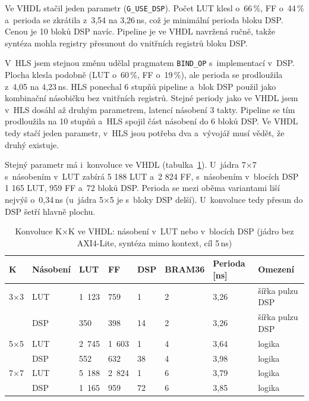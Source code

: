 
Ve VHDL stačil jeden parametr (\texttt{G\_USE\_DSP}). Počet LUT klesl o~66\,\%, FF o~44\,\% a~perioda se zkrátila z~3,54 na 3,26\,ns, což je minimální perioda bloku DSP. Cenou je 10 bloků DSP navíc. Pipeline je ve VHDL navržená ručně, takže syntéza mohla registry přesunout do vnitřních registrů bloku DSP.

V~HLS jsem stejnou změnu udělal pragmatem \texttt{BIND\_OP} s~implementací v~DSP. Plocha klesla podobně (LUT o~60\,\%, FF o~19\,\%), ale perioda se prodloužila z~4,05 na 4,23\,ns. HLS ponechal 6 stupňů pipeline a~blok DSP použil jako kombinační násobičku bez vnitřních registrů. Stejné periody jako ve VHDL jsem v~HLS dosáhl až druhým parametrem, latencí násobení 3 takty. Pipeline se tím prodloužila na 10 stupňů a~HLS spojil část násobení do 6 bloků DSP. Ve VHDL tedy stačí jeden parametr, v~HLS jsou potřeba dva a~vývojář musí vědět, že druhý existuje.

Stejný parametr má i~konvoluce ve VHDL (tabulka~\ref{tab:filtrdsp}). U~jádra 7×7 s~násobením v~LUT zabírá 5 188 LUT a~2 824 FF, s~násobením v~blocích DSP 1 165 LUT, 959 FF a~72 bloků DSP. Perioda se mezi oběma variantami liší nejvýš o~0,34\,ns (u~jádra 5×5 je s~bloky DSP delší). U~konvoluce tedy přesun do DSP šetří hlavně plochu.


\begin{table}[htbp]
    \centering
    \caption{Konvoluce K×K ve VHDL: násobení v~LUT nebo v~blocích DSP (jádro bez AXI4-Lite, syntéza mimo kontext, cíl 5\,ns)}
    \label{tab:filtrdsp}
    \begin{tabular}{p{1.4cm}p{1.6cm}p{1.3cm}p{1.3cm}p{1.1cm}p{1.3cm}p{1.6cm}p{2.8cm}}
        \toprule
        K & Násobení & LUT & FF & DSP & BRAM36 & Perioda [ns] & Omezení \\
        \midrule
        3×3 & LUT & 1 123 & 759 & 1 & 2 & 3,26 & šířka pulzu DSP \\
         & DSP & 350 & 398 & 14 & 2 & 3,26 & šířka pulzu DSP \\
        5×5 & LUT & 2 745 & 1 603 & 1 & 4 & 3,64 & logika \\
         & DSP & 552 & 632 & 38 & 4 & 3,98 & logika \\
        7×7 & LUT & 5 188 & 2 824 & 1 & 6 & 3,79 & logika \\
         & DSP & 1 165 & 959 & 72 & 6 & 3,85 & logika \\
        \bottomrule
    \end{tabular}
\end{table}

